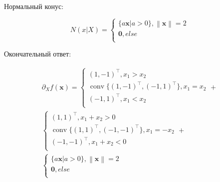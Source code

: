 \documentclass[12pt]{article}
\DeclareMathOperator*{\conv}{conv}
\newcommand\norm[1]{\left\lVert#1\right\rVert}
\begin{document}
Нормальный конус:

\begin{equation}
N(x|X) = 
\begin{cases}
\{a\textbf{x}| a> 0\}, \text{$\norm{\textbf{x}} = 2$}\\
\textbf{0}, else\\
\end{cases}
\end{equation}

Окончательный ответ:

\begin{eqnarray}
\partial_X f(\textbf{x}) = 
\begin{cases}
(1, -1)^{\top}, \text{$x_1>x_2$}\\
\conv\{(1, -1)^{\top}, (-1, 1)^{\top}\}, \text{$x_1=x_2$}\\
(-1, 1)^{\top}, \text{$x_1<x_2$}\\
\end{cases} + \nonumber\\
\begin{cases}
(1, 1)^{\top}, \text{$x_1 +x_2>0$}\\
\conv\{(1, 1)^{\top}, (-1, -1)^{\top}\}, \text{$x_1=-x_2$}\\
(-1, -1)^{\top}, \text{$x_1+x_2<0$}\\
\end{cases} +\nonumber\\
\begin{cases}
\{a\textbf{x}| a> 0\}, \text{$\norm{\textbf{x}} = 2$}\\
\textbf{0}, else\\
\end{cases}
\end{eqnarray}
\end{document}
